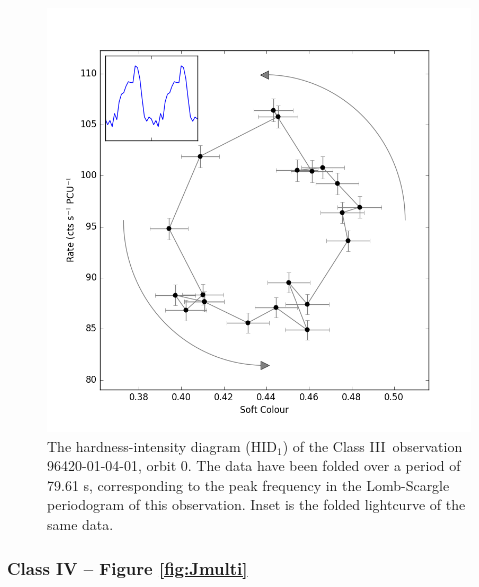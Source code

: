 \begin{figure}
    \includegraphics[width=\columnwidth, trim = 0mm 0mm 0mm 0mm]{images/Gloop.png}
    \captionsetup{singlelinecheck=off}
    \caption[A hardness-intensity diagram of the Class III observation 96420-01-04-01.]{The hardness-intensity diagram (HID$_1$) of the Class III\indexiii\ observation 96420-01-04-01, orbit 0.  The data have been folded over a period of 79.61 s, corresponding to the peak frequency in the Lomb-Scargle periodogram of this observation.  Inset is the folded lightcurve of the same data.}
   \label{fig:LoopIII}
\end{figure}

\subsubsection{Class IV -- Figure \ref{fig:Jmulti}}
\label{sec:classIV}

